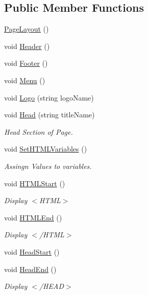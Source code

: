 \subsection*{Public Member Functions}
\begin{DoxyCompactItemize}
\item 
\hyperlink{classPageLayout_ab3f470f006f9820610d9aaebe5b8427b}{Page\-Layout} ()
\item 
void \hyperlink{classPageLayout_a7726061f0653245f644a05807fa92472}{Header} ()
\item 
void \hyperlink{classPageLayout_a68aa868a8868b12964f161838b5f814c}{Footer} ()
\item 
void \hyperlink{classPageLayout_a49af1dca286bbee9432192a7b3c00332}{Menu} ()
\item 
void \hyperlink{classPageLayout_ae60235c6af48e3ebbc6343d02456da0c}{Logo} (string logo\-Name)
\item 
void \hyperlink{classPageLayout_ae50907d56f0ba7a85f7ccfdeafa45bcc}{Head} (string title\-Name)
\begin{DoxyCompactList}\small\item\em Head Section of Page. \end{DoxyCompactList}\item 
void \hyperlink{classHTMLTags_abe32ec84b6b2940afbc993be2db178e9}{Set\-H\-T\-M\-L\-Variables} ()
\begin{DoxyCompactList}\small\item\em Assingn Values to variables. \end{DoxyCompactList}\item 
void \hyperlink{classHTMLTags_a567551cd701d2836d4240b2917b5e13f}{H\-T\-M\-L\-Start} ()
\begin{DoxyCompactList}\small\item\em Display $<$\-H\-T\-M\-L$>$ \end{DoxyCompactList}\item 
void \hyperlink{classHTMLTags_a6553c3d01ee194a1d157e6341333dee3}{H\-T\-M\-L\-End} ()
\begin{DoxyCompactList}\small\item\em Display $<$/\-H\-T\-M\-L$>$ \end{DoxyCompactList}\item 
void \hyperlink{classHTMLTags_af2b01cc08884af52e0b291d07035062e}{Head\-Start} ()
\item 
void \hyperlink{classHTMLTags_afdc779e46fac16cc79e4f0e87f621254}{Head\-End} ()
\begin{DoxyCompactList}\small\item\em Display $<$/\-H\-E\-A\-D$>$ \end{DoxyCompactList}\item 

\end{DoxyCompactItemize}
